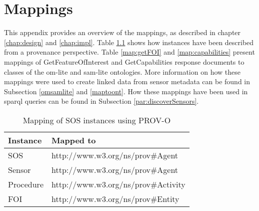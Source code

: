 \chapter{Mappings}
\label{mappings}

This appendix provides an overview of the mappings, as described in chapter \ref{chap:design} and \ref{chap:impl}. Table \ref{map:SOS} shows how instances have been described from a provenance perspective. Table \ref{map:getFOI} and \ref{map:capabilities} present mappings of GetFeatureOfInterest and GetCapabilities response documents to classes of the om-lite and sam-lite ontologies. More information on how these mappings were used to create linked data from sensor metadata can be found in Subsection \ref{omsamlite} and \ref{maptoont}. How these mappings have been used in \ac{sparql} queries can be found in Subsection \ref{par:discoverSensors}. 

\vspace{2cm}

\begin{table}[!htbp]
	\centering
	\caption{Mapping of SOS instances using PROV-O}
	\label{map:SOS}
	\begin{tabular}{l|l}
		Instance		      		  	& Mapped to                           \\ \hline
		SOS  						  	& http://www.w3.org/ns/prov\#Agent     \\
		Sensor                         	& http://www.w3.org/ns/prov\#Agent     \\
		Procedure                       & http://www.w3.org/ns/prov\#Activity  \\
		FOI                           	& http://www.w3.org/ns/prov\#Entity                                                                 
	\end{tabular}
\end{table}

\begin{sidewaystable}[!htbp]
	\centering
	\caption{GetFeatureOfInterest mapping using om-lite and sam-lite}
	\label{map:getFOI}
\end{sidewaystable}

